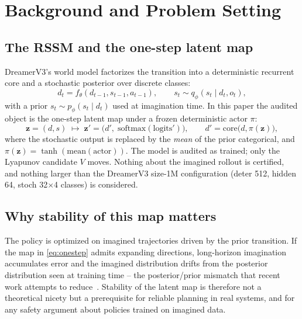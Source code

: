 \documentclass[journal]{IEEEtran}
\newcommand{\zdyn}{\boldsymbol{z}}
\newcommand{\deter}{d}
\newcommand{\stoch}{s}
\begin{document}
\section{Background and Problem Setting}

\subsection{The RSSM and the one-step latent map}

DreamerV3's world model factorizes the transition into a deterministic
recurrent core and a stochastic posterior over discrete classes:
\begin{equation}
  \deter_t = f_\theta(\deter_{t-1}, \stoch_{t-1}, a_{t-1}), \qquad
  \stoch_t \sim q_\phi(\stoch_t \mid \deter_t, o_t),
\end{equation}
with a prior $\stoch_t \sim p_\phi(\stoch_t \mid \deter_t)$ used at
imagination time. In this paper the audited object is the one-step latent map
under a frozen deterministic actor $\pi$:
\begin{equation}
  \zdyn = (\deter, \stoch) \;\mapsto\;
  \zdyn' = \big(\deter',\; \mathrm{softmax}(\mathrm{logits}')\big),
  \qquad
  \deter' = \mathrm{core}\big(\deter, \pi(\zdyn)\big),
  \label{eq:onestep}
\end{equation}
where the stochastic output is replaced by the \emph{mean} of the prior
categorical, and $\pi(\zdyn) = \tanh(\mathrm{mean}(\mathrm{actor}))$. The
model is audited as trained; only the Lyapunov candidate $V$ moves. Nothing
about the imagined rollout is certified, and nothing larger than the
DreamerV3 size-1M configuration (deter 512, hidden 64, stoch 32$\times$4
classes) is considered.

\subsection{Why stability of this map matters}

The policy is optimized on imagined trajectories driven by the prior
transition. If the map in \eqref{eq:onestep} admits expanding directions,
long-horizon imagination accumulates error and the imagined distribution
drifts from the posterior distribution seen at training time -- the
posterior/prior mismatch that recent work
attempts to reduce~\cite{koopman2026,roeder2025}. Stability of the latent map
is therefore not a theoretical nicety but a prerequisite for reliable
planning in real systems, and for any safety argument about policies trained
on imagined data.
\end{document}

